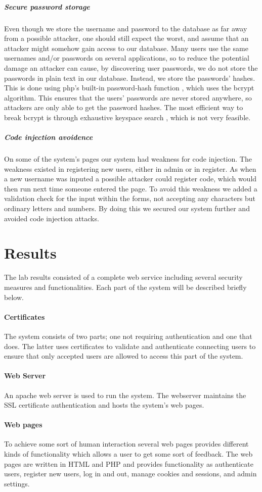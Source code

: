 \documentclass[11pt, a4paper]{article}
\begin{document}
\subparagraph{Secure password storage}
Even though we store the username and password to the database as far away from a possible attacker, one should still expect the worst, and assume that an attacker might somehow gain access to our database. Many users use the same usernames and/or passwords on several applications, so to reduce the potential damage an attacker can cause, by discovering user passwords, we do not store the passwords in plain text in our database. Instead, we store the passwords' hashes. This is done using php's built-in password-hash function \cite{php-hash}, which uses the bcrypt \cite{schneier} algorithm. This ensures that the users' passwords are never stored anywhere, so attackers are only able to get the password hashes. The most efficient way to break bcrypt is through exhaustive keyspace search \cite{schneier}, which is not very feasible.
\subparagraph{Code injection avoidence}
On some of the system's pages our system had weakness for code injection. The weakness existed in registering new users, either in admin or in register. As when a new username was inputed a possible attacker could register code, which would then run next time someone entered the page. To avoid this weakness we added a validation check for the input within the forms, not accepting any characters but ordinary letters and numbers. By doing this we secured our system further and avoided code injection attacks.

\section{Results}
The lab results consisted of a complete web service including several security measures and functionalities. Each part of the system will be described briefly below.
\paragraph{Certificates}
The system consists of two parts; one not requiring authentication and one that does. The latter uses certificates to validate and authenticate connecting users to ensure that only accepted users are allowed to access this part of the system. 
\paragraph{Web Server}
An apache web server is used to run the system. The webserver maintains the SSL certificate authentication and hosts the system's web pages.
\paragraph{Web pages}
To achieve some sort of human interaction several web pages provides different kinds of functionality which allows a user to get some sort of feedback. The web pages are written in HTML and PHP and provides functionality as authenticate users, register new users, log in and out, manage cookies and sessions, and admin settings.
\end{document}
